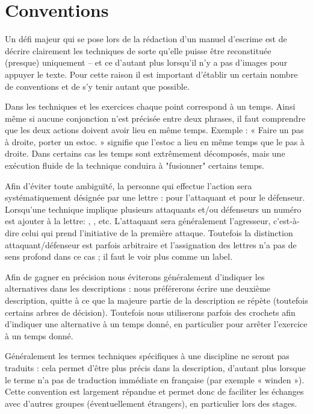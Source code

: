 \chapter{Conventions}
\label{app:conventions}


Un défi majeur qui se pose lors de la rédaction d'un manuel d'escrime est de décrire clairement les techniques de sorte qu'elle puisse être reconstituée (presque) uniquement – et ce d'autant plus lorsqu'il n'y a pas d'images pour appuyer le texte.
Pour cette raison il est important d'établir un certain nombre de conventions et de s'y tenir autant que possible.

Dans les techniques et les exercices chaque point correspond à un temps.
Ainsi même si aucune conjonction n'est précisée entre deux phrases, il faut comprendre que les deux actions doivent avoir lieu en même temps.
Exemple : « Faire un pas à droite, porter un estoc. » signifie que l'estoc a lieu en même temps que le pas à droite.
Dans certains cas les temps sont extrêmement décomposés, mais une exécution fluide de la technique conduira à "fusionner" certains temps.

Afin d'éviter toute ambiguïté, la personne qui effectue l'action sera systématiquement désignée par une lettre : \A pour l'attaquant et \D pour le défenseur.
Lorsqu'une technique implique plusieurs attaquants et/ou défenseurs un numéro est ajouter à la lettre: , , etc.
L'attaquant sera généralement l'agresseur, c'est-à-dire celui qui prend l'initiative de la première attaque.
Toutefois la distinction attaquant/défenseur est parfois arbitraire et l'assignation des lettres n'a pas de sens profond dans ce cas ; il faut le voir plus comme un label.

Afin de gagner en précision nous éviterons généralement d'indiquer les alternatives dans les descriptions : nous préférerons écrire une deuxième description, quitte à ce que la majeure partie de la description se répète (toutefois certains arbres de décision).
Toutefois nous utiliserons parfois des crochets afin d'indiquer une alternative à un temps donné, en particulier pour arrêter l'exercice à un temps donné.

Généralement les termes techniques spécifiques à une discipline ne seront pas traduits : cela permet d'être plus précis dans la description, d'autant plus lorsque le terme n'a pas de traduction immédiate en française (par exemple « winden »).
Cette convention est largement répandue et permet donc de faciliter les échanges avec d'autres groupes (éventuellement étrangers), en particulier lors des stages.

